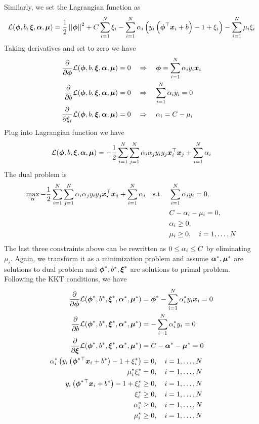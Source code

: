 Similarly, we set the Lagrangian function as
\begin{align*}
	\mathcal{L}(\boldsymbol{\phi},b,\boldsymbol{\xi},\boldsymbol{\alpha},\boldsymbol{\mu})=\frac{1}{2}\left\vert\left\vert \boldsymbol{\phi} \right\vert\right\vert^2+C\sum_{i=1}^N\xi_i-\sum_{i=1}^N\alpha_i\left(y_i\left(\boldsymbol{\phi}^\top\boldsymbol{x}_i+b\right)-1+\xi_i\right)-\sum_{i=1}^N\mu_i\xi_i
\end{align*}
Taking derivatives and set to zero we have
\begin{align*}
	\frac{\partial}{\partial\boldsymbol{\phi}}\mathcal{L}(\boldsymbol{\phi},b,\boldsymbol{\xi},\boldsymbol{\alpha},\boldsymbol{\mu})=0\quad&\Rightarrow\quad\boldsymbol{\phi}=\sum_{i=1}^N\alpha_iy_i\boldsymbol{x}_i \\
	\frac{\partial}{\partial b}\mathcal{L}(\boldsymbol{\phi},b,\boldsymbol{\xi},\boldsymbol{\alpha},\boldsymbol{\mu})=0\quad&\Rightarrow\quad\sum_{i=1}^N\alpha_iy_i=0 \\
	\frac{\partial}{\partial\xi_i}\mathcal{L}(\boldsymbol{\phi},b,\boldsymbol{\xi},\boldsymbol{\alpha},\boldsymbol{\mu})=0\quad&\Rightarrow\quad\alpha_i=C-\mu_i
\end{align*}
Plug into Lagrangian function we have
\begin{align*}
	\mathcal{L}(\boldsymbol{\phi},b,\boldsymbol{\xi},\boldsymbol{\alpha},\boldsymbol{\mu})=-\frac{1}{2}\sum_{i=1}^N\sum_{j=1}^N\alpha_i\alpha_jy_iy_j\boldsymbol{x}_i^\top\boldsymbol{x}_j+\sum_{i=1}^N\alpha_i
\end{align*}
The dual problem is
\begin{align*}
	\max_{\boldsymbol{\alpha}}-\frac{1}{2}\sum_{i=1}^N\sum_{j=1}^N\alpha_i\alpha_jy_iy_j\boldsymbol{x}_i^\top\boldsymbol{x}_j+\sum_{i=1}^N\alpha_i\quad\text{s.t.}\quad&\sum_{i=1}^N\alpha_iy_i=0, \\
	&C-\alpha_i-\mu_i=0, \\
	&\alpha_i\geq 0, \\
	&\mu_i\geq 0,\quad i=1,\dotsc,N
\end{align*}
The last three constraints above can be rewritten as $0\leq\alpha_i\leq C$ by eliminating $\mu_i$. Again, we transform it as a minimization problem and assume $\boldsymbol{\alpha}^*,\boldsymbol{\mu}^*$ are solutions to dual problem and $\boldsymbol{\phi}^*,b^*,\boldsymbol{\xi}^*$ are solutions to primal problem. Following the KKT conditions, we have
\begin{align*}
	\frac{\partial}{\partial\boldsymbol{\phi}}\mathcal{L}(\boldsymbol{\phi}^*,b^*,\boldsymbol{\xi}^*,\boldsymbol{\alpha}^*,\boldsymbol{\mu}^*)&=\boldsymbol{\phi}^*-\sum_{i=1}^N\alpha_i^*y_i\boldsymbol{x}_i=0 \\
	\frac{\partial}{\partial b}\mathcal{L}(\boldsymbol{\phi}^*,b^*,\boldsymbol{\xi}^*,\boldsymbol{\alpha}^*,\boldsymbol{\mu}^*)&=-\sum_{i=1}^N\alpha_i^*y_i=0 \\
	\frac{\partial}{\partial\boldsymbol{\xi}}\mathcal{L}(\boldsymbol{\phi}^*,b^*,\boldsymbol{\xi}^*,\boldsymbol{\alpha}^*,\boldsymbol{\mu}^*)&=C-\boldsymbol{\alpha}^*-\boldsymbol{\mu}^*=0 \\
	\alpha_i^*\left(y_i\left(\boldsymbol{\phi}^*{}^\top\boldsymbol{x}_i+b^*\right)-1+\xi_i^*\right)&=0,\quad i=1,\dotsc,N \\
	\mu_i^*\xi_i^*&=0,\quad i=1,\dotsc,N \\
	y_i\left(\boldsymbol{\phi}^*{}^\top\boldsymbol{x}_i+b^*\right)-1+\xi_i^*&\geq 0,\quad i=1,\dotsc,N \\
	\xi_i^*&\geq 0,\quad i=1,\dotsc,N \\
	\alpha_i^*&\geq 0,\quad i=1,\dotsc,N \\
	\mu_i^*&\geq 0,\quad i=1,\dotsc,N
\end{align*}
